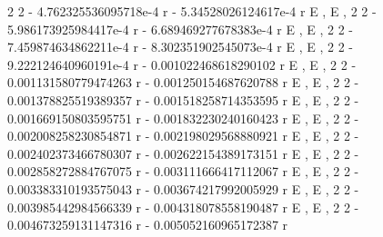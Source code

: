 \documentclass[a4paper,10pt]{article}
\begin{document}
\begin{eulernotebook}
\begin{eulercomment}
\begin{eulercomment}
\begin{eulercomment}
\begin{eulercomment}
\begin{eulercomment}
\begin{eulercomment}
\begin{eulercomment}
\begin{eulercomment}
\begin{eulercomment}
\begin{eulercomment}
\begin{eulercomment}
\begin{eulercomment}
\begin{eulercomment}
\begin{eulercomment}
\begin{eulercomment}
\begin{eulercomment}
\begin{eulercomment}
\begin{eulercomment}
\begin{eulercomment}
\begin{eulercomment}
\begin{eulercomment}
\begin{eulercomment}
\begin{eulercomment}
\begin{eulercomment}
\begin{eulercomment}
\begin{eulercomment}
\begin{eulercomment}
\begin{eulercomment}
\begin{euleroutput}
                           2                          2
   - 4.762325536095718e-4 r    - 5.34528026124617e-4 r
  E                         , E                        , 
                           2                           2
   - 5.986173925984417e-4 r    - 6.689469277678383e-4 r
  E                         , E                         , 
                           2                           2
   - 7.459874634862211e-4 r    - 8.302351902545073e-4 r
  E                         , E                         , 
                           2                           2
   - 9.222124640960191e-4 r    - 0.001022468618290102 r
  E                         , E                         , 
                           2                           2
   - 0.001131580779474263 r    - 0.001250154687620788 r
  E                         , E                         , 
                           2                           2
   - 0.001378825519389357 r    - 0.001518258714353595 r
  E                         , E                         , 
                           2                           2
   - 0.001669150803595751 r    - 0.001832230240160423 r
  E                         , E                         , 
                           2                           2
   - 0.002008258230854871 r    - 0.002198029568880921 r
  E                         , E                         , 
                           2                           2
   - 0.002402373466780307 r    - 0.002622154389173151 r
  E                         , E                         , 
                           2                           2
   - 0.002858272884767075 r    - 0.003111666417112067 r
  E                         , E                         , 
                           2                           2
   - 0.003383310193575043 r    - 0.003674217992005929 r
  E                         , E                         , 
                           2                           2
   - 0.003985442984566339 r    - 0.004318078558190487 r
  E                         , E                         , 
                           2                           2
   - 0.004673259131147316 r    - 0.005052160965172387 r

\end{euleroutput}
\end{eulercomment}
\end{eulercomment}
\end{eulercomment}
\end{eulercomment}
\end{eulercomment}
\end{eulercomment}
\end{eulercomment}
\end{eulercomment}
\end{eulercomment}
\end{eulercomment}
\end{eulercomment}
\end{eulercomment}
\end{eulercomment}
\end{eulercomment}
\end{eulercomment}
\end{eulercomment}
\end{eulercomment}
\end{eulercomment}
\end{eulercomment}
\end{eulercomment}
\end{eulercomment}
\end{eulercomment}
\end{eulercomment}
\end{eulercomment}
\end{eulercomment}
\end{eulercomment}
\end{eulercomment}
\end{eulercomment}
\end{eulernotebook}
\end{document}
